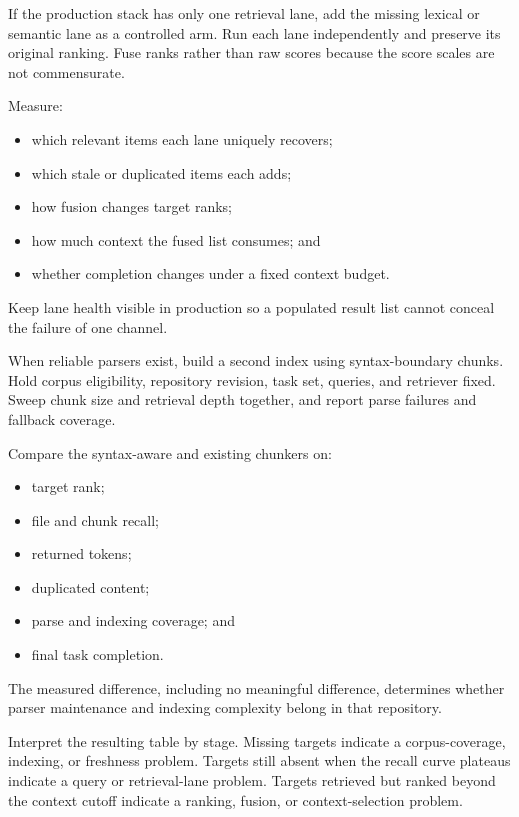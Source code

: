 If the production stack has only one retrieval lane, add the missing lexical or semantic lane as a controlled arm. Run each lane independently and preserve its original ranking. Fuse ranks rather than raw scores because the score scales are not commensurate.


Measure:

\begin{itemize}
\tightlist
\item
  which relevant items each lane uniquely recovers;
\item
  which stale or duplicated items each adds;
\item
  how fusion changes target ranks;
\item
  how much context the fused list consumes; and
\item
  whether completion changes under a fixed context budget.
\end{itemize}

Keep lane health visible in production so a populated result list cannot conceal the failure of one channel.

When reliable parsers exist, build a second index using syntax-boundary chunks. Hold corpus eligibility, repository revision, task set, queries, and retriever fixed. Sweep chunk size and retrieval depth together, and report parse failures and fallback coverage.


Compare the syntax-aware and existing chunkers on:

\begin{itemize}
\tightlist
\item
  target rank;
\item
  file and chunk recall;
\item
  returned tokens;
\item
  duplicated content;
\item
  parse and indexing coverage; and
\item
  final task completion.
\end{itemize}

The measured difference, including no meaningful difference, determines whether parser maintenance and indexing complexity belong in that repository.

Interpret the resulting table by stage. Missing targets indicate a corpus-coverage, indexing, or freshness problem. Targets still absent when the recall curve plateaus indicate a query or retrieval-lane problem. Targets retrieved but ranked beyond the context cutoff indicate a ranking, fusion, or context-selection problem.

